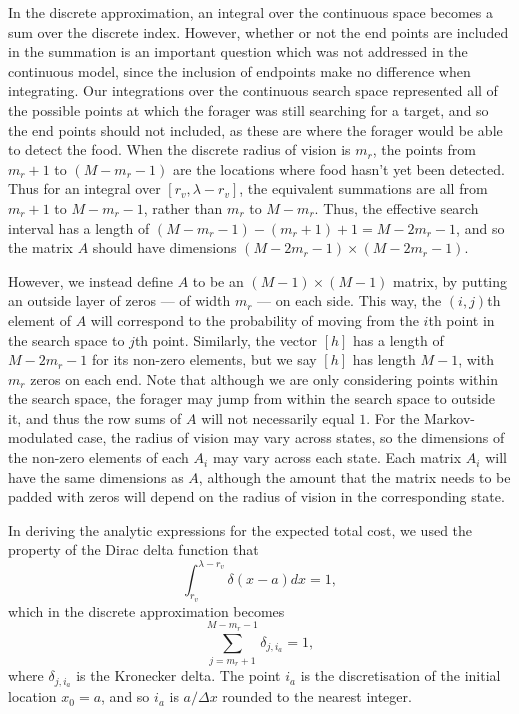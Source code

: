 In the discrete approximation, an integral over the continuous space becomes a sum over the discrete index. However, whether or not the end points are included in the summation is an important question which was not addressed in the continuous model, since the inclusion of endpoints make no difference when integrating. Our integrations over the continuous search space represented all of the possible points at which the forager was still searching for a target, and so the end points should not included, as these are where the forager would be able to detect the food. When the discrete radius of vision is $m_r$, the points from $m_r+1$ to $(M-m_r-1)$ are the locations where food hasn't yet been detected. Thus for an integral over $[r_v,\lambda-r_v]$, the equivalent summations are all from $m_r+1$ to $M-m_r-1$, rather than $m_r$ to $M-m_r$.  Thus, the effective search interval has a length of $(M-m_r-1) - (m_r+1)+1 = M-2m_r-1$, and so the matrix $A$ should have dimensions $(M-2m_r-1)\times(M-2m_r-1)$.

However, we instead define $A$ to be an $(M-1)\times(M-1)$ matrix, by putting an outside layer of zeros --- of width $m_r$ --- on each side. This way, the $(i,j)$th element of $A$ will correspond to the probability of moving from the $i$th point in the search space to $j$th point. Similarly, the vector $[h]$ has a length of $M-2m_r-1$ for its non-zero elements, but we say $[h]$ has length $M-1$, with $m_r$ zeros on each end. Note that although we are only considering points within the search space, the forager may jump from within the search space to outside it, and thus the row sums of $A$ will not necessarily equal $1$. For the Markov-modulated case, the radius of vision may vary across states, so the dimensions of the non-zero elements of each $A_i$ may vary across each state. Each matrix $A_i$ will have the same dimensions as $A$, although the amount that the matrix needs to be padded with zeros will depend on the radius of vision in the corresponding state.

In deriving the analytic expressions for the expected total cost, we used the property of the Dirac delta function that
\begin{equation*}
\int_{r_v}^{\lambda-r_v} \delta(x-a)dx = 1,
\end{equation*}
which in the discrete approximation becomes
\begin{equation*}
\sum_{j=m_r+1}^{M-m_r-1}\delta_{j,i_a} = 1,
\end{equation*}
where $\delta_{j,i_a}$ is the Kronecker delta. The point $i_a$ is the discretisation of the initial location $x_0=a$, and so $i_a$ is $a/\Delta x$ rounded to the nearest integer. 


